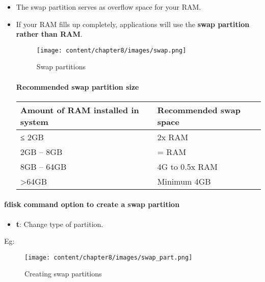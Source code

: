 \setlength{\columnsep}{3pt}
\begin{flushleft}

	\begin{itemize}
		\item  The swap partition serves as overflow space for your RAM.
		\item If your RAM fills up completely, applications will use the \textbf{swap partition rather than RAM}.
		\begin{figure}[h!]
			\centering
			\texttt{[image: content/chapter8/images/swap.png]}
			\caption{Swap partitions}
			\label{swap_naming}
		\end{figure}		
		
		\paragraph{Recommended swap partition size}
		
		\begin{tabulary}{1.0\textwidth}{|p{10em}|p{10em}|}
			\toprule
			\textbf{Amount of RAM installed in system} & \textbf{Recommended swap space}\\
			\midrule
			≤ 2GB & 2x RAM \\
			\hline
			2GB – 8GB & = RAM \\
			\hline
			8GB – 64GB & 4G to 0.5x RAM \\
			\hline
			>64GB & Minimum 4GB\\
			\bottomrule
		\end{tabulary}
		
		
	\end{itemize}

\newpage

\paragraph{fdisk command option to create a swap partition}

\begin{itemize}
	\item \textbf{t}: Change type of partition.
\end{itemize}

Eg:
\begin{figure}[h!]
	\centering
	\texttt{[image: content/chapter8/images/swap\_part.png]}
	\caption{Creating swap partitions}
	\label{primary_swap}
\end{figure}		

	
\end{flushleft}

\newpage

